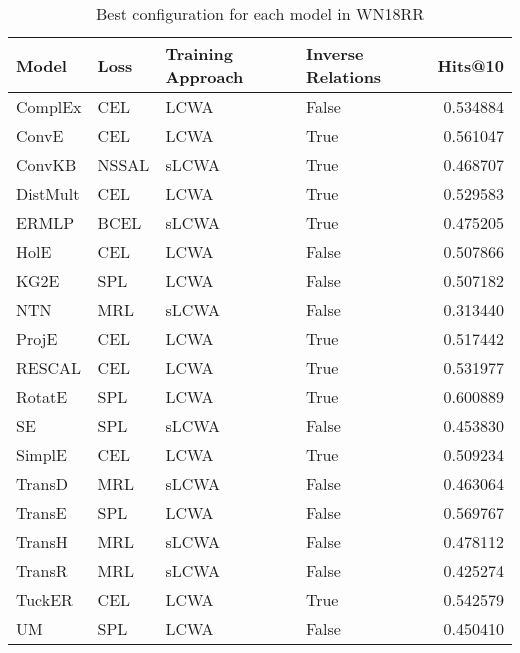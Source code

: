 \begin{table}
\centering
\caption{Best configuration for each model in WN18RR}
\label{best_models_wn18rr}
\begin{tabular}{llllr}
\toprule
    Model &   Loss & Training Approach & Inverse Relations &   Hits@10 \\
\midrule
  ComplEx &    CEL &              LCWA &             False &  0.534884 \\
    ConvE &    CEL &              LCWA &              True &  0.561047 \\
   ConvKB &  NSSAL &             sLCWA &              True &  0.468707 \\
 DistMult &    CEL &              LCWA &              True &  0.529583 \\
    ERMLP &   BCEL &             sLCWA &              True &  0.475205 \\
     HolE &    CEL &              LCWA &             False &  0.507866 \\
     KG2E &    SPL &              LCWA &             False &  0.507182 \\
      NTN &    MRL &             sLCWA &             False &  0.313440 \\
    ProjE &    CEL &              LCWA &              True &  0.517442 \\
   RESCAL &    CEL &              LCWA &              True &  0.531977 \\
   RotatE &    SPL &              LCWA &              True &  0.600889 \\
       SE &    SPL &             sLCWA &             False &  0.453830 \\
   SimplE &    CEL &              LCWA &              True &  0.509234 \\
   TransD &    MRL &             sLCWA &             False &  0.463064 \\
   TransE &    SPL &              LCWA &             False &  0.569767 \\
   TransH &    MRL &             sLCWA &             False &  0.478112 \\
   TransR &    MRL &             sLCWA &             False &  0.425274 \\
   TuckER &    CEL &              LCWA &              True &  0.542579 \\
       UM &    SPL &              LCWA &             False &  0.450410 \\
\bottomrule
\end{tabular}
\end{table}


